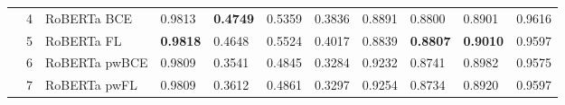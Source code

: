 \documentclass[a4paper,english]{rnti}
\begin{document}
\begin{table*}[htb]
{\begin{tabular}{lllllllllll}
 & 4 & RoBERTa BCE & {\cellcolor[HTML]{FDF5FA}} \color[HTML]{000000} 0.9813 & {\cellcolor[HTML]{FFF7FB}} \color[HTML]{000000} \bfseries 0.4749 & {\cellcolor[HTML]{8EB3D5}} \color[HTML]{000000} 0.5359 & {\cellcolor[HTML]{589EC8}} \color[HTML]{F1F1F1} 0.3836 & {\cellcolor[HTML]{E0DEED}} \color[HTML]{000000} 0.8891 & {\cellcolor[HTML]{FEF6FA}} \color[HTML]{000000} 0.8800 & {\cellcolor[HTML]{F1EBF4}} \color[HTML]{000000} 0.8901 & {\cellcolor[HTML]{E8E4F0}} \color[HTML]{000000} 0.9616 \\

 & 5 & RoBERTa FL & {\cellcolor[HTML]{FFF7FB}} \color[HTML]{000000} \bfseries 0.9818 & {\cellcolor[HTML]{F4EEF6}} \color[HTML]{000000} 0.4648 & {\cellcolor[HTML]{BBC7E0}} \color[HTML]{000000} 0.5524 & {\cellcolor[HTML]{86B0D3}} \color[HTML]{000000} 0.4017 & {\cellcolor[HTML]{DBDAEB}} \color[HTML]{000000} 0.8839 & {\cellcolor[HTML]{FFF7FB}} \color[HTML]{000000} \bfseries 0.8807 & {\cellcolor[HTML]{FFF7FB}} \color[HTML]{000000} \bfseries 0.9010 & {\cellcolor[HTML]{D2D3E7}} \color[HTML]{000000} 0.9597 \\

 & 6 & RoBERTa pwBCE & {\cellcolor[HTML]{FBF3F9}} \color[HTML]{000000} 0.9809 & {\cellcolor[HTML]{045E93}} \color[HTML]{F1F1F1} 0.3541 & {\cellcolor[HTML]{05659F}} \color[HTML]{F1F1F1} 0.4845 & {\cellcolor[HTML]{045B8F}} \color[HTML]{F1F1F1} 0.3284 & {\cellcolor[HTML]{FBF4F9}} \color[HTML]{000000} 0.9232 & {\cellcolor[HTML]{F0EAF4}} \color[HTML]{000000} 0.8741 & {\cellcolor[HTML]{FBF4F9}} \color[HTML]{000000} 0.8982 & {\cellcolor[HTML]{ADC1DD}} \color[HTML]{000000} 0.9575 \\

 & 7 & RoBERTa pwFL & {\cellcolor[HTML]{FBF4F9}} \color[HTML]{000000} 0.9809 & {\cellcolor[HTML]{0566A0}} \color[HTML]{F1F1F1} 0.3612 & {\cellcolor[HTML]{0567A2}} \color[HTML]{F1F1F1} 0.4861 & {\cellcolor[HTML]{045D92}} \color[HTML]{F1F1F1} 0.3297 & {\cellcolor[HTML]{FDF5FA}} \color[HTML]{000000} 0.9254 & {\cellcolor[HTML]{EFE9F3}} \color[HTML]{000000} 0.8734 & {\cellcolor[HTML]{F3EDF5}} \color[HTML]{000000} 0.8920 & {\cellcolor[HTML]{D2D3E7}} \color[HTML]{000000} 0.9597 \\


\end{tabular}}
\end{table*}
\end{document}
